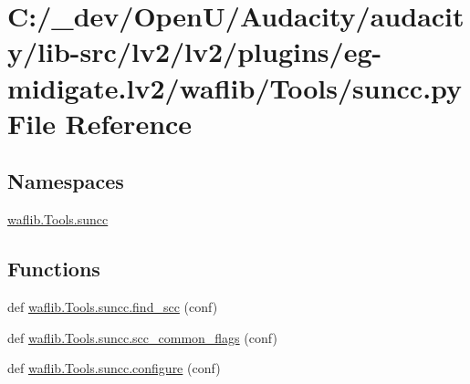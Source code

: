 \hypertarget{lv2_2plugins_2eg-midigate_8lv2_2waflib_2_tools_2suncc_8py}{}\section{C\+:/\+\_\+dev/\+Open\+U/\+Audacity/audacity/lib-\/src/lv2/lv2/plugins/eg-\/midigate.lv2/waflib/\+Tools/suncc.py File Reference}
\label{lv2_2plugins_2eg-midigate_8lv2_2waflib_2_tools_2suncc_8py}
\subsection*{Namespaces}
\begin{DoxyCompactItemize}
\item 
 \hyperlink{namespacewaflib_1_1_tools_1_1suncc}{waflib.\+Tools.\+suncc}
\end{DoxyCompactItemize}
\subsection*{Functions}
\begin{DoxyCompactItemize}
\item 
def \hyperlink{namespacewaflib_1_1_tools_1_1suncc_a810240f3b4d36933a366acad20a2d809}{waflib.\+Tools.\+suncc.\+find\+\_\+scc} (conf)
\item 
def \hyperlink{namespacewaflib_1_1_tools_1_1suncc_a783044dc96ae339c6feba5c8dbb9c95e}{waflib.\+Tools.\+suncc.\+scc\+\_\+common\+\_\+flags} (conf)
\item 
def \hyperlink{namespacewaflib_1_1_tools_1_1suncc_ae6f8e7665e3dfa76f606cbe655d4faf9}{waflib.\+Tools.\+suncc.\+configure} (conf)
\end{DoxyCompactItemize}
